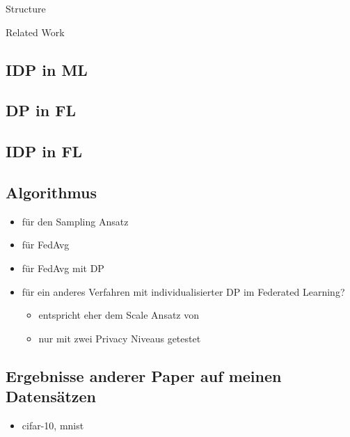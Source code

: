 \begin{chapter}{Structure}
\begin{section}{Related Work}
		\subsection{IDP in ML}
		
		\subsection{DP in FL}
		
		\subsection{IDP in FL}
		
		\subsection{Algorithmus}
		\begin{itemize}
			\item \cite{boenisch:2023} für den Sampling Ansatz
			\item \cite{mcmahan:2016} für FedAvg
			\item \cite{mcmahan:2018} für FedAvg mit DP
			\item \cite{aldaghri:2023} für ein anderes Verfahren mit individualisierter DP im Federated Learning?
			\begin{itemize}
				\item entspricht eher dem Scale Ansatz von \cite{boenisch:2023}
				\item nur mit zwei \glqq{}Privacy Niveaus\grqq{} getestet
			\end{itemize}
		\end{itemize}
		
		\subsection{Ergebnisse anderer Paper auf meinen Datensätzen}
		
		\begin{itemize}
			\item cifar-10, mnist \cite{sun:2021}
		\end{itemize}
	\end{section}
\end{chapter}